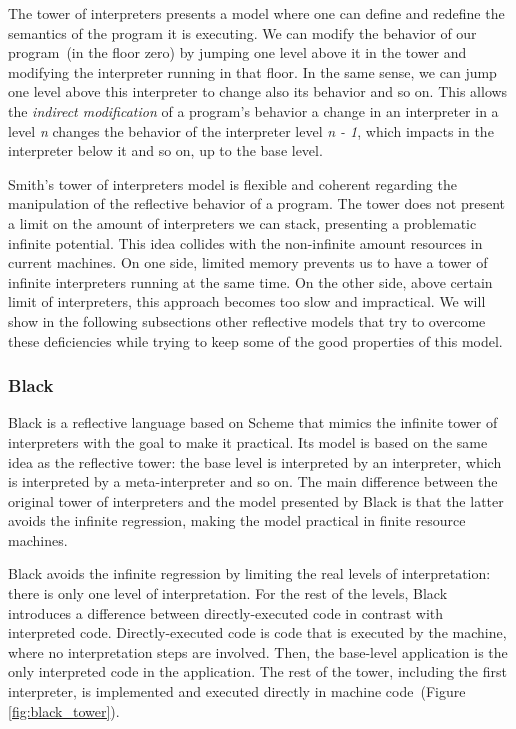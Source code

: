 The tower of interpreters presents a model where one can define and redefine the semantics of the program it is executing. We can modify the behavior of our program~(in the floor zero) by jumping one level above it in the tower and modifying the interpreter running in that floor. In the same sense, we can jump one level above this interpreter to change also its behavior and so on. This allows the \emph{indirect modification} of a program's behavior \ie a change in an interpreter in a level \emph{n} changes the behavior of the interpreter level \emph{n - 1}, which impacts in the interpreter below it and so on, up to the base level.

Smith's tower of interpreters model is flexible and coherent regarding the manipulation of the reflective behavior of a program. The tower does not present a limit on the amount of interpreters we can stack, presenting a problematic infinite potential. This idea collides with the non-infinite amount resources in current machines. On one side, limited memory prevents us to have a tower of infinite interpreters running at the same time. On the other side, above certain limit of interpreters, this approach becomes too slow and impractical. We will show in the following subsections other reflective models that try to overcome these deficiencies while trying to keep some of the good properties of this model.

\subsubsection*{Black}

Black is a reflective language based on Scheme that mimics the infinite tower of interpreters with the goal to make it practical. Its model is based on the same idea as the reflective tower: the base level is interpreted by an interpreter, which is interpreted by a meta-interpreter and so on. The main difference between the original tower of interpreters and the model presented by Black is that the latter avoids the infinite regression, making the model practical in finite resource machines.

Black avoids the infinite regression by limiting the real levels of interpretation: there is only one level of interpretation. For the rest of the levels, Black  introduces a difference between directly-executed code in contrast with interpreted code. Directly-executed code is code that is executed by the machine, where no interpretation steps are involved. Then, the base-level application is the only interpreted code in the application. The rest of the tower, including the first interpreter, is implemented and executed directly in machine code~(Figure \ref{fig:black_tower}).

